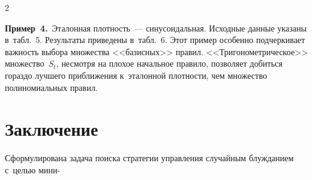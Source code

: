 \begin{multicols}{2}
  
  
  \noindent
  \textbf{Пример~4.}\ Эталонная плот\-ность~--- синусоидальная. Исходные 
данные указаны в~табл.~5. Результаты приведены в~табл.~6. Этот пример 
особенно подчеркивает важ\-ность выбора множества <<базисных>> правил. 
<<Тригонометрическое>> множество~$S_t$, несмотря на плохое начальное 
правило, позволяет добиться гораздо лучшего при\-бли\-же\-ния к~эталонной 
плот\-ности, чем множество полиномиальных правил.
   
   
\vspace*{-14pt}

  
  \section{Заключение}
  
\vspace*{-5pt}
  
  Сформулирована задача поиска стратегии управ\-ле\-ния случайным 
блужданием с~целью мини-\linebreak\vspace*{-12pt}

\pagebreak

\end{multicols}

